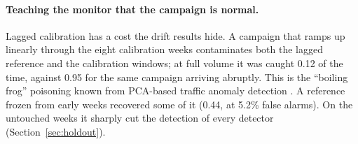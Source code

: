 \paragraph{Teaching the monitor that the campaign is normal.} Lagged calibration has a cost the drift results hide. A campaign that ramps up linearly through the eight calibration weeks contaminates both the lagged reference and the calibration windows; at full volume it was caught 0.12 of the time, against 0.95 for the same campaign arriving abruptly. This is the ``boiling frog'' poisoning known from PCA-based traffic anomaly detection \citep{rubinstein2009antidote}. A reference frozen from early weeks recovered some of it (0.44, at 5.2\% false alarms). On the untouched weeks it sharply cut the detection of every detector (Section~\ref{sec:holdout}).
